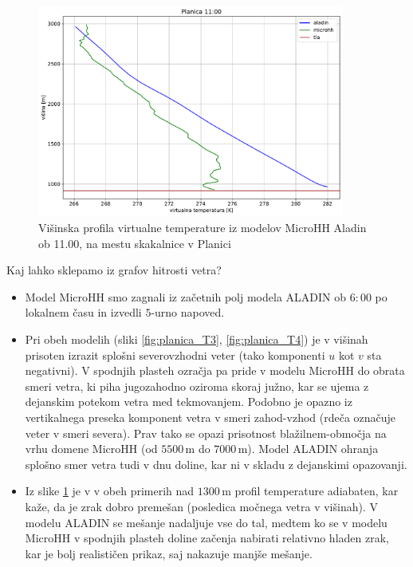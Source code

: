 \documentclass[mat2, tisk]{fmfdelo}
\begin{document}
\begin{figure}[h!]
  \centering
  \includegraphics[width=0.9\textwidth]{rezultati/tv_planica_long_5.pdf}
  \caption{Višinska profila virtualne temperature iz modelov MicroHH Aladin ob 11.00, na mestu skakalnice v Planici \label{fig:planica_uy}}
  \label{fig:planica_vy}
\end{figure}


Kaj lahko sklepamo iz grafov hitrosti vetra?

\begin{itemize}
  \item Model MicroHH smo zagnali iz začetnih polj modela ALADIN ob \(6{:}00\) po lokalnem času in izvedli \(5\)-urno napoved.
   \item Pri obeh modelih (sliki \ref{fig:planica_T3}, \ref{fig:planica_T4}) je v višinah prisoten izrazit 
   splošni severovzhodni veter (tako komponenti \(u\) 
   kot \(v\) sta negativni). V spodnjih plasteh ozračja 
   pa pride v modelu {MicroHH} do obrata smeri 
   vetra, ki piha jugozahodno oziroma skoraj južno, kar 
   se ujema z dejanskim potekom vetra med tekmovanjem. 
   Podobno je opazno iz vertikalnega preseka komponent 
   vetra v smeri zahod-vzhod (rdeča označuje veter v 
   smeri severa). Prav tako se opazi prisotnost 
   blažilnem-območja na vrhu domene {MicroHH} 
   (od \(5500\,\mathrm{m}\) do \(7000\,\mathrm{m}\)). 
   Model {ALADIN} ohranja splošno smer vetra tudi 
    v dnu doline, kar ni v skladu z dejanskimi opazovanji.
  \item Iz slike \ref{fig:planica_vy} je v v obeh primerih nad \(1300\,\mathrm{m}\) 
  profil temperature adiabaten, kar kaže, da je zrak 
  dobro premešan (posledica močnega vetra v višinah). 
  V modelu {ALADIN} se mešanje nadaljuje vse do 
  tal, medtem ko se v modelu {MicroHH} v spodnjih
  plasteh doline začenja nabirati relativno hladen zrak,
  kar je bolj realističen prikaz, saj nakazuje manjše 
  mešanje.

\end{itemize}
\end{document}
